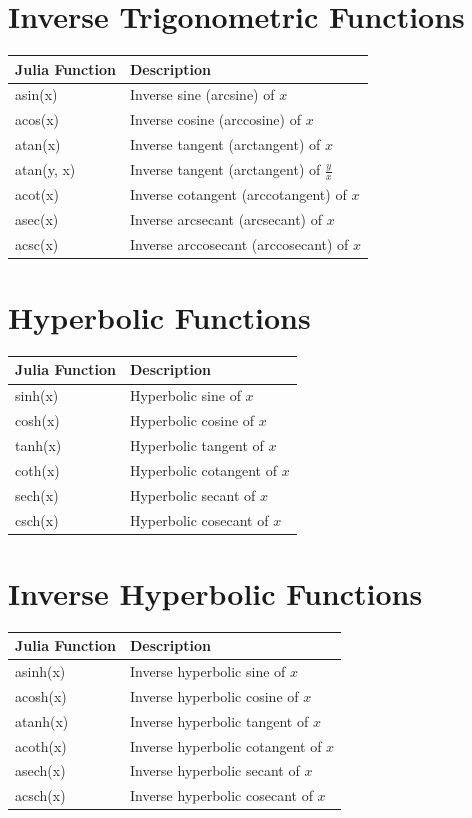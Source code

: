 \documentclass[12pt,answers]{book}
\begin{document}
\section{Inverse Trigonometric Functions}
\begin{tabular}{>{\ttfamily}l l}
  \toprule
  \textbf{Julia Function} & \textbf{Description} \\
  \midrule
  asin(x) & Inverse sine (arcsine) of $x$ \\
  acos(x) & Inverse cosine (arccosine) of $x$ \\
  atan(x) & Inverse tangent (arctangent) of $x$ \\
  atan(y, x) & Inverse tangent (arctangent) of $\frac{y}{x}$ \\
  acot(x) & Inverse cotangent (arccotangent) of $x$ \\
  asec(x) & Inverse arcsecant (arcsecant) of $x$ \\
  acsc(x) & Inverse arccosecant (arccosecant) of $x$ \\
  \bottomrule
\end{tabular}

\section{Hyperbolic Functions}
\begin{tabular}{>{\ttfamily}l l}
  \toprule
  \textbf{Julia Function} & \textbf{Description} \\
  \midrule
  sinh(x) & Hyperbolic sine of $x$ \\
  cosh(x) & Hyperbolic cosine of $x$ \\
  tanh(x) & Hyperbolic tangent of $x$ \\
  coth(x) & Hyperbolic cotangent of $x$ \\
  sech(x) & Hyperbolic secant of $x$ \\
  csch(x) & Hyperbolic cosecant of $x$ \\
  \bottomrule
\end{tabular}

\section{Inverse Hyperbolic Functions}
\begin{tabular}{>{\ttfamily}l l}
  \toprule
  \textbf{Julia Function} & \textbf{Description} \\
  \midrule
  asinh(x) & Inverse hyperbolic sine of $x$ \\
  acosh(x) & Inverse hyperbolic cosine of $x$ \\
  atanh(x) & Inverse hyperbolic tangent of $x$ \\
  acoth(x) & Inverse hyperbolic cotangent of $x$ \\
  asech(x) & Inverse hyperbolic secant of $x$ \\
  acsch(x) & Inverse hyperbolic cosecant of $x$ \\
  \bottomrule
\end{tabular}
\end{document}

